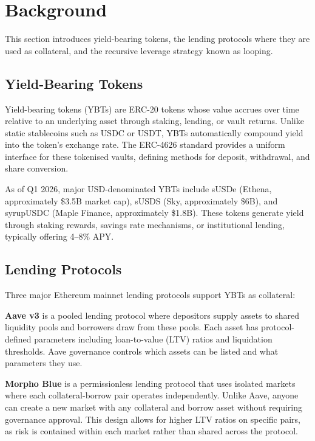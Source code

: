 \section{Background}
\label{sec:background}

This section introduces yield-bearing tokens, the lending protocols where they are used as collateral, and the recursive leverage strategy known as looping.

\subsection{Yield-Bearing Tokens}

Yield-bearing tokens (YBTs) are ERC-20 tokens whose value accrues over time relative to an underlying asset through staking, lending, or vault returns. Unlike static stablecoins such as USDC or USDT, YBTs automatically compound yield into the token's exchange rate. The ERC-4626 standard provides a uniform interface for these tokenised vaults, defining methods for deposit, withdrawal, and share conversion.

As of Q1 2026, major USD-denominated YBTs include sUSDe (Ethena, approximately \$3.5B market cap), sUSDS (Sky, approximately \$6B), and syrupUSDC (Maple Finance, approximately \$1.8B). These tokens generate yield through staking rewards, savings rate mechanisms, or institutional lending, typically offering 4--8\% APY.

\subsection{Lending Protocols}

Three major Ethereum mainnet lending protocols support YBTs as collateral:

\textbf{Aave v3} is a pooled lending protocol where depositors supply assets to shared liquidity pools and borrowers draw from these pools. Each asset has protocol-defined parameters including loan-to-value (LTV) ratios and liquidation thresholds. Aave governance controls which assets can be listed and what parameters they use.

\textbf{Morpho Blue} is a permissionless lending protocol that uses isolated markets where each collateral-borrow pair operates independently. Unlike Aave, anyone can create a new market with any collateral and borrow asset without requiring governance approval. This design allows for higher LTV ratios on specific pairs, as risk is contained within each market rather than shared across the protocol.

